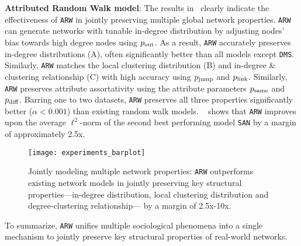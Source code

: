 \textbf{Attributed Random Walk model}: The results in~ clearly indicate the effectiveness
of \texttt{ARW} in {jointly} preserving multiple
global network properties. \texttt{ARW} can generate networks with tunable
in-degree distribution by adjusting nodes' bias towards high degree nodes
using $p_{\scriptsize\mbox{out}}$. As a result, \texttt{ARW} accurately preserves
in-degree distributions (A), often significantly better
than all models except \texttt{DMS}. Similarly, \texttt{ARW} matches the local clustering
distribution  (B) and in-degree \& clustering relationship
(C) with high accuracy using $p_{\scriptsize\mbox{jump}}$ and
$p_{\scriptsize\mbox{link}}$. Similarly, \texttt{ARW} preserves attribute assortativity using
the attribute parameters $p_{\scriptsize\mbox{same}}$ and $p_{\scriptsize\mbox{diff}}$.
Barring one to two datasets, \texttt{ARW} preserves all three properties significantly
better ($\alpha < 0.001$) than existing random walk models.
~ shows that \texttt{ARW} improves upon the average $\ell^2$-norm
of the second best performing model \texttt{SAN} by a margin of approximately 2.5x.
\begin{figure}
	\centering
	\vspace{-6pt}
	\texttt{[image: experiments\_barplot]}
	\caption{Jointly modeling multiple network properties: \texttt{ARW} outperforms
		existing network models in jointly preserving key structural properties---in-degree
		distribution, local clustering distribution and degree-clustering relationship---
		by a margin of 2.5x-10x.
	}
	\vspace{-8pt}
	\label{fig:barplot}
\end{figure}

To summarize, \texttt{ARW} unifies multiple sociological phenomena
into a single mechanism to jointly preserve key structural
properties of real-world networks.




